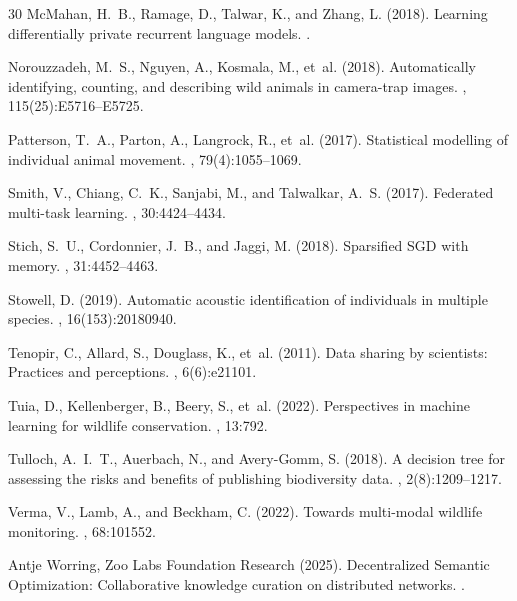 \begin{thebibliography}{30}
McMahan, H.~B., Ramage, D., Talwar, K., and Zhang, L. (2018).
\newblock Learning differentially private recurrent language models.
.

Norouzzadeh, M.~S., Nguyen, A., Kosmala, M., et~al. (2018).
\newblock Automatically identifying, counting, and describing wild animals in camera-trap images.
, 115(25):E5716--E5725.

Patterson, T.~A., Parton, A., Langrock, R., et~al. (2017).
\newblock Statistical modelling of individual animal movement.
, 79(4):1055--1069.

Smith, V., Chiang, C.~K., Sanjabi, M., and Talwalkar, A.~S. (2017).
\newblock Federated multi-task learning.
, 30:4424--4434.

Stich, S.~U., Cordonnier, J.~B., and Jaggi, M. (2018).
\newblock Sparsified SGD with memory.
, 31:4452--4463.

Stowell, D. (2019).
\newblock Automatic acoustic identification of individuals in multiple species.
, 16(153):20180940.

Tenopir, C., Allard, S., Douglass, K., et~al. (2011).
\newblock Data sharing by scientists: Practices and perceptions.
, 6(6):e21101.

Tuia, D., Kellenberger, B., Beery, S., et~al. (2022).
\newblock Perspectives in machine learning for wildlife conservation.
, 13:792.

Tulloch, A.~I.~T., Auerbach, N., and Avery-Gomm, S. (2018).
\newblock A decision tree for assessing the risks and benefits of publishing biodiversity data.
, 2(8):1209--1217.

Verma, V., Lamb, A., and Beckham, C. (2022).
\newblock Towards multi-modal wildlife monitoring.
, 68:101552.

Antje Worring, Zoo Labs Foundation Research (2025).
\newblock Decentralized Semantic Optimization: Collaborative knowledge curation on distributed networks.
.

\end{thebibliography}

